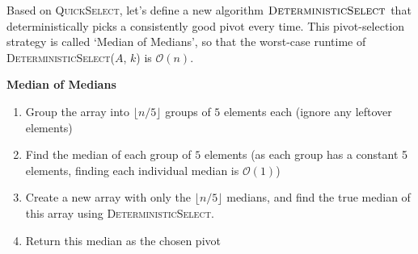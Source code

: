 \documentclass[11pt]{article}
\begin{document}
    Based on \textsc{QuickSelect}, let's define a new algorithm $\textsc{DeterministicSelect}$ that deterministically picks a consistently good pivot every time.
    This pivot-selection strategy is called `Median of Medians', so that the worst-case runtime of \textsc{DeterministicSelect}($A$, $k$) is $\mathcal{O}(n)$.

\begin{center}
    \begin{minipage}{12cm}
    \begin{framed}
    \noindent\textbf{Median of Medians}

    \begin{enumerate}[1.]
        \item Group the array into $\lfloor n/5 \rfloor$ groups of $5$ elements each (ignore any leftover elements)
        \item Find the median of each group of $5$ elements (as each group has a constant 5 elements, finding each individual median is $\mathcal{O}(1)$)
        \item Create a new array with only the $\lfloor n/5 \rfloor$ medians, and find the true median of this array using \textsc{DeterministicSelect}.
        \item Return this median as the chosen pivot
    \end{enumerate}
    \end{framed}
    \end{minipage}
    \end{center}
    
\end{document}
